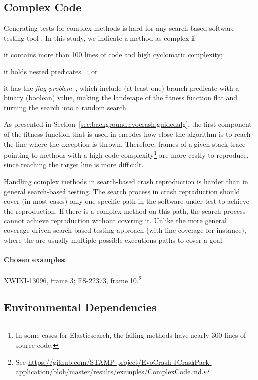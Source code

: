 \subsection{Complex Code}

Generating tests for complex methods is hard for any search-based software testing tool \cite{MarkFlag}. In this study, we indicate a method as complex if 
\begin{inparaenum}[(i)]
\item it contains more than 100 lines of code and high cyclomatic complexity; 
\item it holds nested predicates ~\cite{GordonFlag, MarkFlag}; or
\item it has the \textit{flag problem}~\cite{GordonFlag,McMinn2011}, which include (at least one) branch predicate with a binary (boolean) value, making the landscape of the fitness function flat and turning the search into a random search \cite{MarkFlag}.
\end{inparaenum}

As presented in Section~\ref{sec:background:evocrash:guidedalg}, the first component of the fitness function that is used in \evocrash encodes how close the algorithm is to reach the line where the exception is thrown.
Therefore, frames of a given stack trace pointing to methods with a high code complexity\footnote{In some cases for Elasticsearch, the failing methods have nearly 300 lines of source code.} are more costly to reproduce, since reaching the target line is more difficult.  

Handling complex methods in search-based crash reproduction is harder than in general search-based testing. 
The search process in crash reproduction should cover (in most cases) only one specific path in the software under test to achieve the reproduction. 
If there is a complex method on this path, the search process cannot achieve reproduction without covering it. 
Unlike the more general coverage driven search-based testing approach (with line coverage for instance), where the are usually multiple possible executions paths to cover a goal.

\paragraph{Chosen examples:} 
XWIKI-13096, frame 3;
ES-22373, frame 10.\footnote{See \url{https://github.com/STAMP-project/EvoCrash-JCrashPack-application/blob/master/results/examples/ComplexCode.md}.}


\subsection{Environmental Dependencies} 


